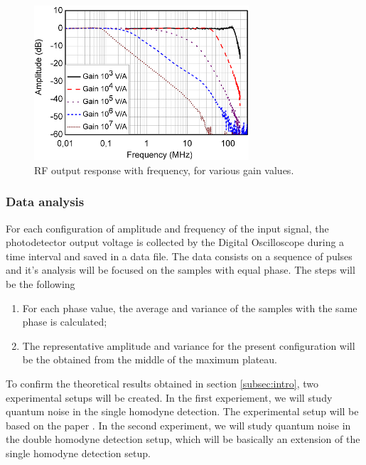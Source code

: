 %
\begin{figure}[H]
	\centering
	\includegraphics[width=8cm]{./sdf/optical_detection/figures/thorlabs-manual-gain-spec-rf.png}
	\caption{RF output response with frequency, for various gain values. \cite{thorlabs}}
	\label{plot:freq-response-rf}
\end{figure}
%
%
%
%

\subsubsection{Data analysis}
%
For each configuration of amplitude and frequency of the input signal, the photodetector output voltage is collected by the Digital Oscilloscope during a time interval and saved in a data file. The data consists on a sequence of pulses and it's analysis will be focused on the samples with equal phase. The steps will be the following
%
\begin{enumerate}
\item For each phase value, the average and variance of the samples with the same phase is calculated;
\item The representative amplitude and variance for the present configuration will be the obtained from the middle of the maximum plateau.
\end{enumerate}
%
%
%
%
To confirm the theoretical results obtained in section \ref{subsec:intro}, two experimental setups will be created. In the first experiement, we will study quantum noise in the single homodyne detection. The experimental setup will be based on the paper \cite{chi2011balanced}. In the second experiment, we will study quantum noise in the double homodyne detection setup, which will be basically an extension of the single homodyne detection setup.\\
\\
